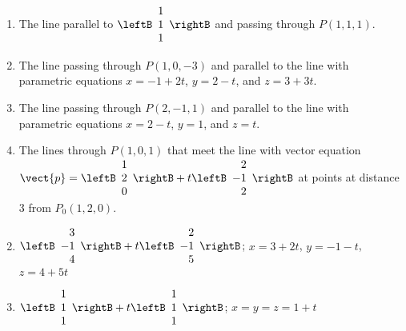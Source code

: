 \begin{multicols}{2}
\begin{ex}
\begin{enumerate}[label={\alph*.}]
\item The line parallel to 
$\leftB
\begin{array}{r}
1\\
1\\
1
\end{array}
\rightB$
and passing through $P(1, 1, 1)$.

\item The line passing through $P(1, 0, -3)$ and parallel to the line with parametric equations $x = -1 + 2t$, $y = 2 - t$, and $z = 3 + 3t$.

\item The line passing through $P(2, -1, 1)$ and parallel to the line with parametric equations $x = 2 - t$, $y = 1$, and $z = t$.

\item The lines through $P(1, 0, 1)$ that meet the line with vector equation 
$\vect{p} = \leftB
\begin{array}{r}
1\\
2\\
0
\end{array}
\rightB
+ t
\leftB
\begin{array}{r}
2\\
-1\\
2
\end{array}
\rightB$
 at points at distance 3 from $P_{0}(1, 2, 0)$.

\end{enumerate}
\begin{sol}
\begin{enumerate}[label={\alph*.}]
\setcounter{enumi}{1}
\item 
$\leftB
\begin{array}{r}
3\\
-1\\
4
\end{array}
\rightB
+ t
\leftB
\begin{array}{r}
2\\
-1\\
5
\end{array}
\rightB$;
$x = 3 + 2t$, $y = -1 -t$, $z = 4 + 5t$

\setcounter{enumi}{3}
\item
$\leftB
\begin{array}{r}
1\\
1\\
1
\end{array}
\rightB
+ t
\leftB
\begin{array}{r}
1\\
1\\
1
\end{array}
\rightB$;
$x = y = z = 1 + t$


\end{enumerate}
\end{sol}
\end{ex}
\end{multicols}
